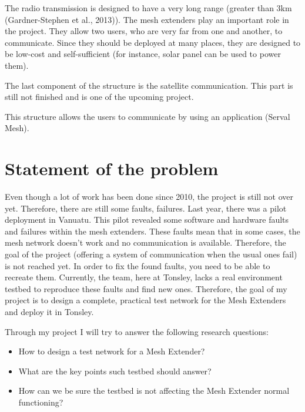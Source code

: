 The radio transmission is designed to have a very long range (greater than 3km (Gardner-Stephen et al., 2013)). The mesh extenders play an important role in the project. They allow two users, who are very far from one and another, to communicate. Since they should be deployed at many places, they are designed to be low-cost and self-sufficient (for instance, solar panel can be used to power them). 

The last component of the structure is the satellite communication. This part is still not finished and is one of the upcoming project.

This structure allows the users to communicate by using an application (Serval Mesh).




\section{Statement of the problem}

Even though a lot of work has been done since 2010, the project is still not over yet. Therefore, there are still some faults, failures. 
Last year, there was a pilot deployment in Vanuatu. This pilot revealed some software and hardware faults and failures within the mesh extenders. These faults mean that in some cases, the mesh network doesn’t work and no communication is available. Therefore, the goal of the project (offering a system of communication when the usual ones fail) is not reached yet. 
In order to fix the found faults, you need to be able to recreate them. Currently, the team, here at Tonsley, lacks a real environment testbed to reproduce these faults and find new ones. Therefore, the goal of my project is to design a complete, practical test network for the Mesh Extenders and deploy it in Tonsley.

Through my project I will try to answer the following research questions:
\begin{itemize}
	\item How to design a test network for a Mesh Extender?
	\item What are the key points such testbed should answer?
	\item How can we be sure the testbed is not affecting the Mesh Extender normal functioning?
\end{itemize}
